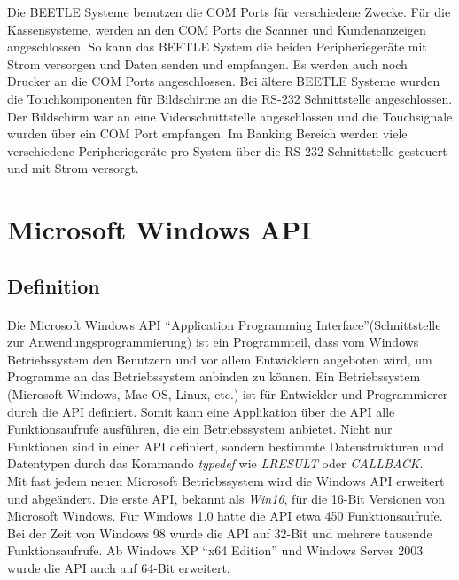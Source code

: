 Die BEETLE Systeme benutzen die COM Ports für verschiedene Zwecke. Für die Kassensysteme, werden an den COM Ports die Scanner und Kundenanzeigen angeschlossen. So kann das BEETLE System die beiden Peripheriegeräte mit Strom versorgen und Daten senden und empfangen. Es werden auch noch Drucker an die COM Ports angeschlossen. Bei ältere BEETLE Systeme wurden die Touchkomponenten für Bildschirme an die RS-232 Schnittstelle angeschlossen. Der Bildschirm war an eine Videoschnittstelle angeschlossen und die Touchsignale wurden über ein COM Port empfangen. Im Banking Bereich werden viele verschiedene Peripheriegeräte pro System über die RS-232 Schnittstelle gesteuert und mit Strom versorgt.



\newpage





\section{Microsoft Windows API}
\subsection{Definition}

\paragraph{}
Die Microsoft Windows API "`Application Programming Interface"'(Schnittstelle zur Anwendungsprogrammierung) ist ein Programmteil, dass vom Windows Betriebssystem den Benutzern und vor allem Entwicklern angeboten wird, um Programme an das Betriebssystem anbinden zu können. Ein Betriebssystem (Microsoft Windows, Mac OS, Linux, etc.) ist für Entwickler und Programmierer durch die API definiert. Somit kann eine Applikation über die API alle Funktionsaufrufe ausführen, die ein Betriebssystem anbietet. Nicht nur Funktionen sind in einer API definiert, sondern bestimmte Datenstrukturen und Datentypen durch das Kommando \textit{typedef} wie \textit{LRESULT} oder \textit{CALLBACK}.
\\

Mit fast jedem neuen Microsoft Betriebssystem wird die Windows API erweitert und abgeändert. Die erste API, bekannt als \textit{Win16}, für die 16-Bit Versionen von Microsoft Windows. Für Windows 1.0 hatte die API etwa 450 Funktionsaufrufe. Bei der Zeit von Windows 98 wurde die API auf 32-Bit und mehrere tausende Funktionsaufrufe. Ab Windows XP "`x64 Edition"' und Windows Server 2003 wurde die API auch auf 64-Bit erweitert.
\\

